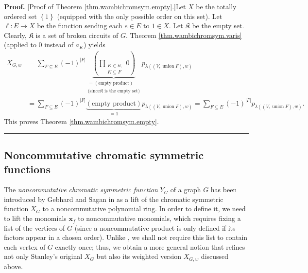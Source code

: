 \documentclass[numbers=enddot,12pt,final,onecolumn,notitlepage]{scrartcl}%
\theoremstyle{definition}
\newenvironment{proof}[1][Proof]{\noindent\textbf{#1.} }{\ \rule{0.5em}{0.5em}}
\newenvironment{verlong}{}{}
\let\sumnonlimits\sum
\let\prodnonlimits\prod
\renewcommand{\sum}{\sumnonlimits\limits}
\renewcommand{\prod}{\prodnonlimits\limits}
\begin{document}
\begin{verlong}
\begin{proof}
[Proof of Theorem \ref{thm.wambichromsym.empty}.]Let $X$ be the totally
ordered set $\left\{  1\right\}  $ (equipped with the only possible order on
this set). Let $\ell:E\rightarrow X$ be the function sending each $e\in E$ to
$1\in X$. Let $\mathfrak{K}$ be the empty set. Clearly, $\mathfrak{K}$ is a
set of broken circuits of $G$. Theorem \ref{thm.wambichromsym.varis} (applied
to $0$ instead of $a_{K}$) yields%
\begin{align*}
X_{G,w}  &  =\sum_{F\subseteq E}\left(  -1\right)  ^{\left\vert F\right\vert
}\underbrace{\left(  \prod_{\substack{K\in\mathfrak{K};\\K\subseteq
F}}0\right)  }_{\substack{=\left(  \text{empty product}\right)  \\\text{(since
}\mathfrak{K}\text{ is the empty set)}}}p_{\lambda\left(  \left(
V,\operatorname*{union}F\right)  ,w\right)  }\\
&  =\sum_{F\subseteq E}\left(  -1\right)  ^{\left\vert F\right\vert
}\underbrace{\left(  \text{empty product}\right)  }_{=1}p_{\lambda\left(
\left(  V,\operatorname*{union}F\right)  ,w\right)  }=\sum_{F\subseteq
E}\left(  -1\right)  ^{\left\vert F\right\vert }p_{\lambda\left(  \left(
V,\operatorname*{union}F\right)  ,w\right)  }.
\end{align*}
This proves Theorem \ref{thm.wambichromsym.empty}.
\end{proof}
\end{verlong}

\subsection{Noncommutative chromatic symmetric functions}

The \emph{noncommutative chromatic symmetric function} $Y_{G}$ of a graph $G$
has been introduced by Gebhard and Sagan in \cite[\S 3]{GebSag01} as a lift of
the chromatic symmetric function $X_{G}$ to a noncommutative polynomial ring.
In order to define it, we need to lift the monomials $\mathbf{x}_{f}$ to
noncommutative monomials, which requires fixing a list of the vertices of $G$
(since a noncommutative product is only defined if its factors appear in a
chosen order). Unlike \cite{GebSag01}, we shall not require this list to
contain each vertex of $G$ exactly once; thus, we obtain a more general notion
that refines not only Stanley's original $X_{G}$ but also its weighted version
$X_{G,w}$ discussed above.
\end{document}
